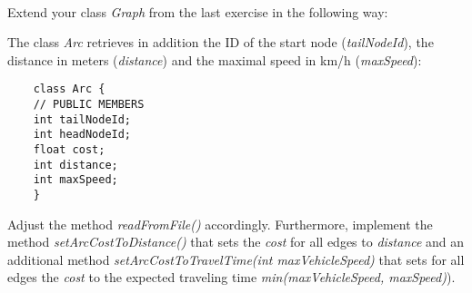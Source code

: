  \\
Extend your class \emph{Graph} from the last exercise in the following way:

The class \emph{Arc} retrieves in addition the ID of the start node 
(\emph{tailNodeId}), the distance in meters  (\emph{distance}) and the maximal 
speed in km/h  (\emph{maxSpeed}):

{\small
	\begin{verbatim}
	class Arc {
	// PUBLIC MEMBERS
	int tailNodeId;
	int headNodeId;
	float cost;
	int distance;
	int maxSpeed;
	}
	\end{verbatim}
}

Adjust the method \emph{readFromFile()} accordingly.
Furthermore, implement the method  \emph{setArcCostToDistance()} that sets the 
\emph{cost} for all edges to \emph{distance} and an additional method 
\emph{setArcCostToTravelTime(int maxVehicleSpeed)} that sets for all edges the 
\emph{cost} to the expected traveling time \emph{min(maxVehicleSpeed, 
maxSpeed)}).